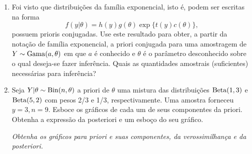 \documentclass[11pt,a4]{article}\usepackage[]{graphicx}\usepackage[]{xcolor}
\begin{document}
\begin{enumerate}
\begin{extra}
  {\it Escolha valores dos hiperparâmetros do modelo e produza gráficos das prioris $f(\alpha)$, $f(\beta)$ e da conjunta
    $f(\alpha, \beta)$. Use o modelo especificado para gerar uma amostra de $n = 12$ valores. Obtenha gráficos dos itens a) a c).
    Obtenha amostras da posteriori conforme item d). Faça o histograma das amostras obtidas e sobreponha com a densidade (marginal) teórica.}
\end{extra}

\begin{solucao}

\end{solucao}



\item Foi visto que distribuições da família exponencial, isto é,  podem ser escritas na forma
  \[ f(y|\theta) = h(y) g(\theta) \exp\{t(y) c(\theta)\}, \] 
  possuem prioris conjugadas.
  Use este resultado para obter, a partir da notação de família exponencial,
  a priori conjugada para uma amostragem de $Y \sim {\rm Gama}(a, \theta)$
  em que $a$ é conhecido e $\theta$ é o 
  parâmetro desconhecido sobre o qual deseja-se fazer inferência.
  Quais as quantidades amostrais (suficientes) necessárias para inferência?

    
\item Seja $Y|\theta \sim {\rm Bin}(n, \theta)$ a priori de $\theta$ uma mistura das distribuições ${\rm Beta}(1, 3)$ e $ {\rm Beta}(5, 2)$ com pesos 2/3 e 1/3, respectivamente. Uma amostra forneceu $y = 3, n = 9$. Esboce os gráficos de cada um de seus componentes da priori. Obtenha a expressão da posteriori e um esboço do seu gráfico.

\begin{extra}
{\it Obtenha os gráficos para priori e suas componentes, da verossimilhança e da posteriori. }
\end{extra}


\end{enumerate}
\end{document}
